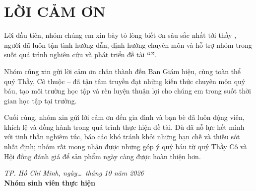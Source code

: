 \chapter*{LỜI CẢM ƠN}

Lời đầu tiên, nhóm chúng em xin bày tỏ lòng biết ơn sâu sắc nhất tới thầy \textbf{\InstructorName}, người đã luôn tận tình hướng dẫn, định hướng chuyên môn và hỗ trợ nhóm trong suốt quá trình nghiên cứu và phát triển đề tài \textbf{``\ProjectTitle''}.

Nhóm cũng xin gửi lời cảm ơn chân thành đến Ban Giám hiệu, cùng toàn thể quý Thầy, Cô thuộc \textbf{\InstituteName} -- \textbf{\UnivName} đã tận tâm truyền đạt những kiến thức chuyên môn quý báu, tạo môi trường học tập và rèn luyện thuận lợi cho chúng em trong suốt thời gian học tập tại trường.

Cuối cùng, nhóm xin gửi lời cảm ơn đến gia đình và bạn bè đã luôn động viên, khích lệ và đồng hành trong quá trình thực hiện đề tài. Dù đã nỗ lực hết mình với tinh thần nghiêm túc, báo cáo khó tránh khỏi những hạn chế và thiếu sót nhất định; nhóm rất mong nhận được những góp ý quý báu từ quý Thầy Cô và Hội đồng đánh giá để sản phẩm ngày càng được hoàn thiện hơn.

\vspace{1.0cm}
\begin{flushright}
    \textit{TP. Hồ Chí Minh, ngày\dots\ tháng 10 năm 2026}\\[0.2cm]
    \textbf{Nhóm sinh viên thực hiện}\par
    \vspace{0.3cm}
    \textit{\StudentOne}\\
    \textit{\StudentTwo}\\
    \textit{\StudentThree}
\end{flushright}
